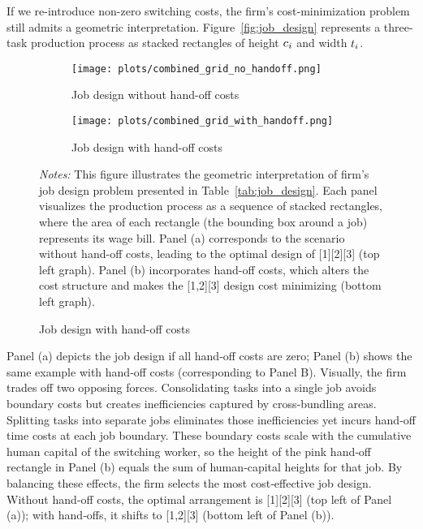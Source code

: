 \documentclass{article}
\theoremstyle{plain}
\theoremstyle{plain}
\begin{document}
If we re-introduce non-zero switching costs, the firm’s cost‐minimization problem still admits a geometric interpretation.  
Figure~\ref{fig:job_design} represents 
a three-task production process
as stacked rectangles of height $c_{i}$ and width $t_{i}$.
\begin{figure}[htbp]
  \begin{center}
  \caption{Geometric interpretation of job designs for the \(n=3\) tasks example} \label{fig:job_design}
  \begin{subfigure}[b]{0.6\textwidth}
    \texttt{[image: plots/combined\_grid\_no\_handoff.png]}
    \caption{Job design without hand-off costs}
  \end{subfigure}
  \hfill
  \begin{subfigure}[b]{0.6\textwidth}
    \texttt{[image: plots/combined\_grid\_with\_handoff.png]}
    \caption{Job design with hand-off costs}
  \end{subfigure}
  \end{center}
  \footnotesize{\emph{Notes:} This figure illustrates the geometric interpretation of firm's job design problem presented in Table~\ref{tab:job_design}. Each panel visualizes the production process as a sequence of stacked rectangles, where the area of each rectangle (the bounding box around a job) represents its wage bill. Panel (a) corresponds to the scenario without hand-off costs, leading to the optimal design of [1][2][3] (top left graph). Panel (b) incorporates hand-off costs, which alters the cost structure and makes the [1,2][3] design cost minimizing (bottom left graph).}
\end{figure}
Panel (a) depicts the job design if all hand‐off costs are zero; Panel (b) shows the same example with hand‐off costs (corresponding to Panel B).
Visually, the firm trades off two opposing forces.
Consolidating tasks into a single job avoids boundary costs but creates inefficiencies captured by cross‐bundling areas.  
Splitting tasks into separate jobs eliminates those inefficiencies yet incurs hand‐off time costs at each job boundary.  
These boundary costs scale with the cumulative human capital of the switching worker, so the height of the pink hand‐off rectangle in Panel (b) equals the sum of human‐capital heights for that job.
By balancing these effects, the firm selects the most cost‐effective job design.  
Without hand‐off costs, the optimal arrangement is [1][2][3] (top left of Panel (a)); with hand‐offs, it shifts to [1,2][3] (bottom left of Panel (b)).  
\end{document}

